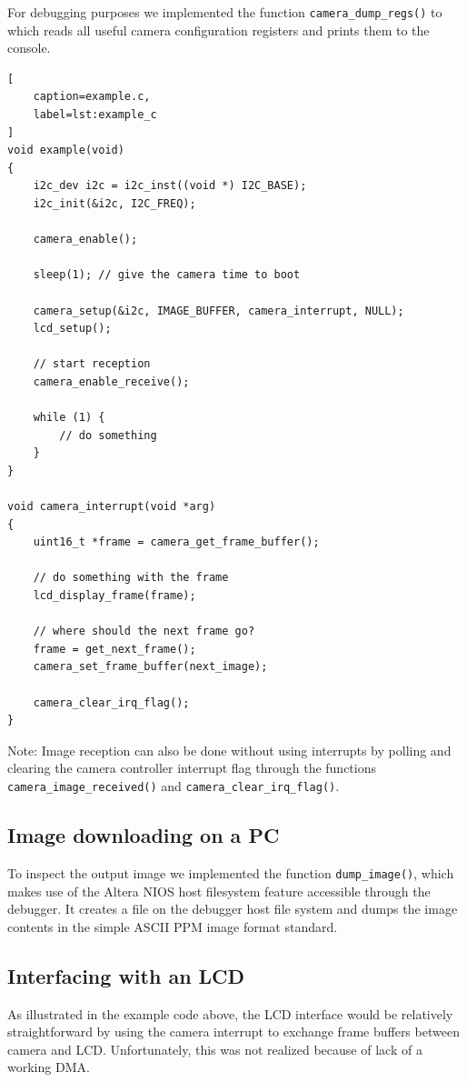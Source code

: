 \documentclass{article}
\begin{document}
For debugging purposes we implemented the function \verb'camera_dump_regs()' to which reads all useful camera configuration registers and prints them to the console.

\begin{lstlisting}[
    caption=example.c,
    label=lst:example_c
]
void example(void)
{
    i2c_dev i2c = i2c_inst((void *) I2C_BASE);
    i2c_init(&i2c, I2C_FREQ);

    camera_enable();

    sleep(1); // give the camera time to boot

    camera_setup(&i2c, IMAGE_BUFFER, camera_interrupt, NULL);
    lcd_setup();

    // start reception
    camera_enable_receive();

    while (1) {
        // do something
    }
}

void camera_interrupt(void *arg)
{
    uint16_t *frame = camera_get_frame_buffer();

    // do something with the frame
    lcd_display_frame(frame);

    // where should the next frame go?
    frame = get_next_frame();
    camera_set_frame_buffer(next_image);

    camera_clear_irq_flag();
}
\end{lstlisting}


Note: Image reception can also be done without using interrupts by polling and clearing the camera controller interrupt flag through the functions \verb'camera_image_received()' and \verb'camera_clear_irq_flag()'.

\subsection{Image downloading on a PC}
To inspect the output image we implemented the function \verb'dump_image()', which makes use of the Altera NIOS host filesystem feature accessible through the debugger. It creates a file on the debugger host file system and dumps the image contents in the simple ASCII PPM image format standard.

\subsection{Interfacing with an LCD}
As illustrated in the example code above, the LCD interface would be relatively straightforward by using the camera interrupt to exchange frame buffers between camera and LCD. Unfortunately, this was not realized because of lack of a working DMA.
\end{document}

